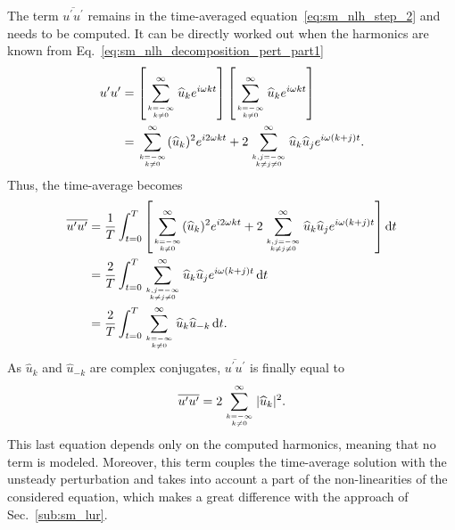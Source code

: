 The term $\overline{u^\prime u^\prime}$ remains in the time-averaged
equation~\eqref{eq:sm_nlh_step_2}
and needs to be computed. It can be 
directly worked out when the harmonics are known 
from Eq.~\eqref{eq:sm_nlh_decomposition_pert_part1}
\begin{equation}
	\begin{split}
		u^\prime u^\prime &= 
		\left[
			\sum_{\genfrac{}{}{0pt}{}{k=-\infty}{k \neq 0}}^{\infty} \widehat{u}_k e^{i \omega k t} 
		\right]
		\left[
			\sum_{\genfrac{}{}{0pt}{}{k=-\infty}{k \neq 0}}^{\infty} \widehat{u}_k e^{i \omega k t} 
		\right] \\
		&= \sum_{\genfrac{}{}{0pt}{}{k=-\infty}{k \neq 0}}^{\infty} (\widehat{u}_k)^2
		   e^{i 2 \omega k t} +
		   2 \sum_{\genfrac{}{}{0pt}{}{k,j=-\infty}{k \neq j \neq 0}}^{\infty} 
		   \widehat{u}_k \widehat{u}_j e^{i \omega (k + j) t}.
	\end{split}
\end{equation}
Thus, the time-average becomes
\begin{equation}
	\begin{split}
		\overline{u^\prime u^\prime} &= 
		\frac{1}{T} \int_{t=0}^{T} \left[ 
			\sum_{\genfrac{}{}{0pt}{}{k=-\infty}{k \neq 0}}^{\infty} (\widehat{u}_k)^2
		   	e^{i 2 \omega k t} +
		   	2 \sum_{\genfrac{}{}{0pt}{}{k,j=-\infty}{k \neq j \neq 0}}^{\infty} 
		   	\widehat{u}_k \widehat{u}_j e^{i \omega (k + j) t} 
		\right] \diff t\\
		&= \frac{2}{T} \int_{t=0}^{T} \sum_{\genfrac{}{}{0pt}{}{k,j=-\infty}{k \neq j \neq 0}}^{\infty} 
		   	\widehat{u}_k \widehat{u}_j 
		   	e^{i \omega (k + j) t} \diff t \\
		&= \frac{2}{T} \int_{t=0}^{T} 
			\sum_{\genfrac{}{}{0pt}{}{k=-\infty}{k \neq 0}}^{\infty} 
			\widehat{u}_k \widehat{u}_{-k}  \diff t.
	\end{split}
\end{equation}
As $\widehat{u}_k$ and $\widehat{u}_{-k}$ are complex conjugates,
$\overline{u^\prime u^\prime}$ is finally equal to
\begin{equation}
	\overline{u^\prime u^\prime} = 
	2 \sum_{\genfrac{}{}{0pt}{}{k=-\infty}{k \neq 0}}^{\infty} |\widehat{u}_k|^2.
	\label{eq:sm_nlh_deterministic_stress_terms}
\end{equation}
This last equation depends only on the computed harmonics, meaning
that no term is modeled. Moreover, this term couples the
time-average solution with the unsteady perturbation
and takes into account a part of the 
non-linearities of the considered equation, which makes a
great difference with the approach of Sec.~\ref{sub:sm_lur}.

